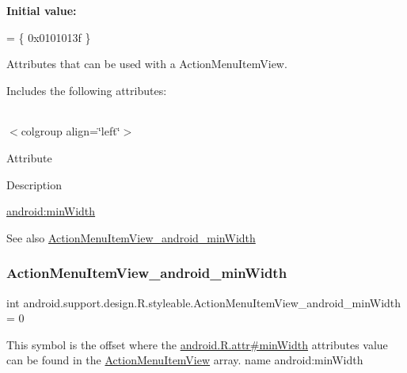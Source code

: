 {\bfseries Initial value\+:}
\begin{DoxyCode}
= \{
            0x0101013f
        \}
\end{DoxyCode}
Attributes that can be used with a Action\+Menu\+Item\+View. 

Includes the following attributes\+:

\tabulinesep=1mm
\begin{longtabu} spread 0pt [c]{*{0}{|X[-1]}|}
\hline
\end{longtabu}
$<$colgroup align=\char`\"{}left\char`\"{}$>$ 

Attribute

Description 

{\ttfamily \hyperlink{classandroid_1_1support_1_1design_1_1R_1_1styleable_ae892e88d62f26ff9d5e53a8c339a9837}{android\+:min\+Width}}

\begin{DoxySeeAlso}{See also}
\hyperlink{classandroid_1_1support_1_1design_1_1R_1_1styleable_ae892e88d62f26ff9d5e53a8c339a9837}{Action\+Menu\+Item\+View\+\_\+android\+\_\+min\+Width} 
\end{DoxySeeAlso}
\mbox{\label{classandroid_1_1support_1_1design_1_1R_1_1styleable_ae892e88d62f26ff9d5e53a8c339a9837}} 
\subsubsection{\texorpdfstring{Action\+Menu\+Item\+View\+\_\+android\+\_\+min\+Width}{ActionMenuItemView\_android\_minWidth}}
{\footnotesize\ttfamily int android.\+support.\+design.\+R.\+styleable.\+Action\+Menu\+Item\+View\+\_\+android\+\_\+min\+Width = 0\hspace{0.3cm}{\ttfamily [static]}}

This symbol is the offset where the \hyperlink{}{android.\+R.\+attr\#min\+Width} attribute\textquotesingle{}s value can be found in the \hyperlink{classandroid_1_1support_1_1design_1_1R_1_1styleable_a8012131c7219387ea0073f47dbd32125}{Action\+Menu\+Item\+View} array.  name android\+:min\+Width \mbox{\label{classandroid_1_1support_1_1design_1_1R_1_1styleable_a4d18219c3fcb3eb5fec8cdc13873f0bd}} 
